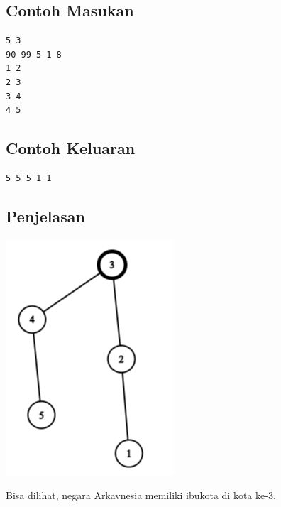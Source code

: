 \documentclass{article}
\begin{document}
\begin{multicols}{2}
\subsection*{Contoh Masukan}
\begin{lstlisting}
5 3
90 99 5 1 8
1 2
2 3
3 4
4 5
\end{lstlisting}
\columnbreak
\subsection*{Contoh Keluaran}
\begin{lstlisting}
5 5 5 1 1
\end{lstlisting}
\vfill
\null
\end{multicols}

\subsection*{Penjelasan}
\begin{center}
\includegraphics{graph.PNG}  
\end{center}

Bisa dilihat, negara Arkavnesia memiliki ibukota di kota ke-3.
\end{document}
